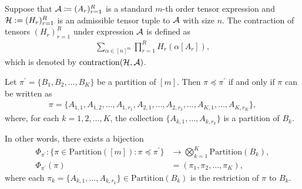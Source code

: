 \documentclass[letterpaper,11pt]{article}
\newcommand{\partition}{\mathrm{Partition}}
\newcommand{\partitionp}[1]{\partition(#1)}
\newcommand{\tensorcontraction}{\mathrm{contraction}}
\begin{document}

\begin{definition}\label{def:tensor_contraction}
    Suppose that ${\mathcal{A}} \coloneqq (A_r)_{r=1}^R$ is a standard $m$-th order tensor expression and ${\mathcal{H}} := (H_r)_{r=1}^R$ is an admissible tensor tuple to ${\mathcal{A}}$ with size $n$. The contraction of tensors $(H_r)_{r=1}^R$ under expression ${\mathcal{A}}$ is defined as
    \begin{align*}
        \sum_{\alpha \in [n]^m} \prod_{r=1}^R H_r(\alpha[A_r]),  
    \end{align*}
    which is denoted by $\tensorcontraction(\calH, \calA)$.
\end{definition}

\begin{lemma}
\label{lem:partial_order_partition}
Let $\pi^{\prime} = \{ B_1, B_2, \dots, B_K \}$ be a partition of $[m]$. Then $\pi \preceq \pi^{\prime}$ if and only if $\pi$ can be written as
\begin{align*}
\pi = \{ A_{1,1}, A_{1,2}, \dots, A_{1,r_1}, A_{2,1}, \dots, A_{2,r_2}, \dots, A_{K,1}, \dots, A_{K,r_K} \},
\end{align*}
where, for each $k = 1, 2, \dots, K$, the collection $\{ A_{k,1}, \dots, A_{k,r_k} \}$ is a partition of $B_k$.

In other words, there exists a bijection
\begin{align*}
\Phi_{\pi^{\prime}} : \{ \pi \in \partitionp{[m]} : \pi \preceq \pi^{\prime} \} &\to \bigotimes_{k=1}^{K} \partitionp{B_k}, \\
\Phi_{\pi^{\prime}}(\pi) &= (\pi_1, \pi_2, \dots, \pi_K),
\end{align*}
where each $\pi_k = \{ A_{k,1}, \dots, A_{k,r_k} \} \in \partitionp{B_k}$ is the restriction of $\pi$ to $B_k$.
\end{lemma}
\end{document}

